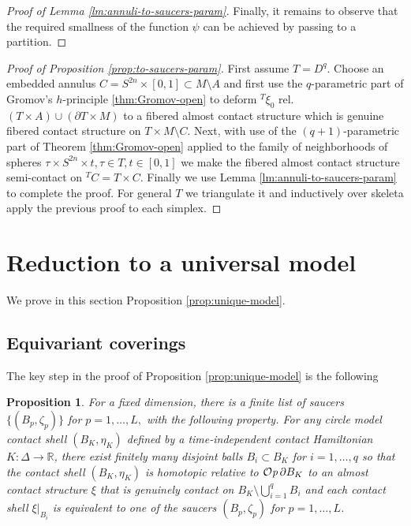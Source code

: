 \documentclass[12pt]{paper}
\theoremstyle{plain}
\newtheorem{proposition}[theorem]{Proposition}
\theoremstyle{definition}
\newcommand{\p}{\partial}
\newcommand{\R}{{\mathbb{R}}}
\def\Op{{\mathcal O}{\it p}\,}
\numberwithin{figure}{section}
\begin{document}
\begin{proof}[Proof of Lemma \ref{lm:annuli-to-saucers-param}]
  Finally, it remains to observe that the required smallness of the function  $ \psi$    can   be   achieved by passing to a partition.   \end{proof}  
  \medskip
 
  \begin{proof}[Proof of Proposition \ref{prop:to-saucers-param}] First assume $T = D^q$. Choose an embedded annulus $C=S^{2n}\times[0,1]\subset M\setminus A$ and first use   the $q$-parametric part of Gromov's $h$-principle \ref{thm:Gromov-open} to deform ${}^T\xi_0$ rel.\ $(T\times A)\cup(\p T\times M)$ to a fibered almost contact structure which is genuine fibered contact structure on $T\times M\setminus C$. Next, with use of the $(q+1)$-parametric part of Theorem \ref{thm:Gromov-open}   applied to the family of neighborhoods of spheres $\tau\times S^{2n}\times t, \tau\in T, t\in[0,1]$  we make the fibered almost contact structure semi-contact on ${}^TC=T\times C$. Finally we use Lemma \ref{lm:annuli-to-saucers-param} to complete the proof. For general $T$ we  triangulate it and  inductively over skeleta apply the previous proof to each simplex.
 \end{proof}




\section{Reduction to a universal model}\label{sec:universal}
We prove in this section Proposition \ref{prop:unique-model}.
  
  \subsection{Equivariant coverings}\label{sec:equi-cov}
The key step in the proof of Proposition \ref{prop:unique-model} is the following  
 \begin{proposition}\label{prop:circular-to-universal-saucers}
 For a fixed dimension, there is a finite list of saucers $\{(B_p,\zeta_p)\}$ for $p=1,\dots, L,$
with the following property.
 For any circle model contact shell $(B_K, \eta_K)$ defined by a
   time-independent contact Hamiltonian $K\colon\Delta\to\R$,
    there exist finitely many  disjoint balls $B_i\subset B_K$ for $i=1,\dots, q$
     so that the contact shell $(B_K, \eta_K)$ is homotopic relative to $\Op\p B_K$ to an almost contact structure 
     $\xi$ that is genuinely contact on $B_K \setminus \bigcup_{i=1}^{q} B_i$
     and each contact shell  $\xi|_{B_i}$ is equivalent to one of the saucers $(B_p,\zeta_p)$ for $p=1,\dots, L$.  
     \end{proposition}
\end{document}
